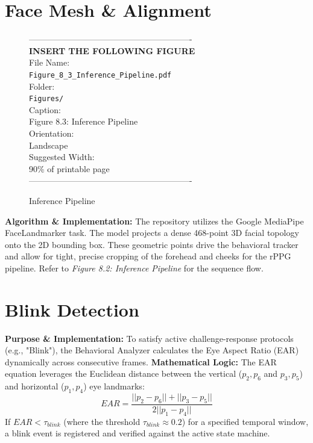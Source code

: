\documentclass[12pt, a4paper]{report}
\begin{document}
\section{Face Mesh \& Alignment}
\begin{figure}[htbp]
\begin{center}
----------------------------------------------------------\\
\vspace{0.5em}
\textbf{INSERT THE FOLLOWING FIGURE}\\
\vspace{1em}
File Name:\\
\texttt{Figure\_8\_3\_Inference\_Pipeline.pdf}\\
\vspace{1em}
Folder:\\
\texttt{Figures/}\\
\vspace{1em}
Caption:\\
Figure 8.3: Inference Pipeline\\
\vspace{1em}
Orientation:\\
Landscape\\
\vspace{1em}
Suggested Width:\\
90\% of printable page\\
\vspace{3cm}
----------------------------------------------------------
\end{center}
\caption{Inference Pipeline}
\label{fig:diag_5}
\end{figure}
\textbf{Algorithm \& Implementation:} The repository utilizes the Google MediaPipe FaceLandmarker task. The model projects a dense 468-point 3D facial topology onto the 2D bounding box. These geometric points drive the behavioral tracker and allow for tight, precise cropping of the forehead and cheeks for the rPPG pipeline. Refer to \textit{Figure 8.2: Inference Pipeline} for the sequence flow.

\section{Blink Detection}
\textbf{Purpose \& Implementation:} To satisfy active challenge-response protocols (e.g., "Blink"), the Behavioral Analyzer calculates the Eye Aspect Ratio (EAR) dynamically across consecutive frames.
\textbf{Mathematical Logic:} The EAR equation leverages the Euclidean distance between the vertical ($p_2, p_6$ and $p_3, p_5$) and horizontal ($p_1, p_4$) eye landmarks:
\begin{equation}
EAR = \frac{||p_2 - p_6|| + ||p_3 - p_5||}{2 ||p_1 - p_4||}
\end{equation}
If $EAR < \tau_{blink}$ (where the threshold $\tau_{blink} \approx 0.2$) for a specified temporal window, a blink event is registered and verified against the active state machine.
\end{document}
